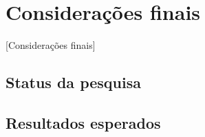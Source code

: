 \chapter{Considerações finais}[Considerações finais]\label{ch:consideracoes}

\section{Status da pesquisa}

\section{Resultados esperados}

